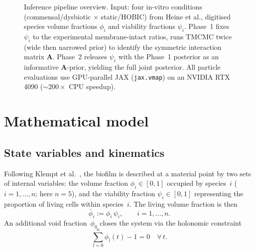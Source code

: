 \documentclass[11pt,a4paper]{article}
\begin{document}
\begin{figure}[htbp]
\caption{Inference pipeline overview. Input: four in-vitro conditions (commensal/dysbiotic $\times$ static/HOBIC) from Heine et al., digitised species volume fractions $\phi_i$ and viability fractions $\psi_i$. Phase~1 fixes $\psi_i$ to the experimental membrane-intact ratios, runs TMCMC twice (wide then narrowed prior) to identify the symmetric interaction matrix $\mathbf{A}$. Phase~2 releases $\psi_i$ with the Phase~1 posterior as an informative $\mathbf{A}$-prior, yielding the full joint posterior. All particle evaluations use GPU-parallel JAX (\texttt{jax.vmap}) on an NVIDIA RTX\,4090 (${\sim}200\times$ CPU speedup).}
\label{fig:pipeline}
\end{figure}

\section{Mathematical model}
\label{sec:model}

\subsection{State variables and kinematics}

Following Klempt et al.~\cite{Klempt2025ContinuumBiofilm, Klempt2024ContinuumGrowth}, the biofilm is described at a material point by two sets of internal variables: the volume fraction $\phi_i \in [0,1]$ occupied by species~$i$ ($i=1,\dots,n$; here $n=5$), and the viability fraction $\psi_i \in [0,1]$ representing the proportion of living cells within species~$i$.
The living volume fraction is then
\begin{equation}
\bar{\phi}_i := \phi_i\,\psi_i,
\qquad i=1,\dots,n.
\label{eq:living}
\end{equation}
An additional void fraction~$\phi_0$ closes the system via the holonomic constraint
\begin{equation}
\sum_{l=0}^{n}\phi_l(t) - 1 = 0 \quad\forall\,t.
\label{eq:constraint}
\end{equation}
\end{document}
